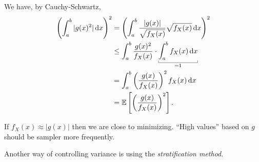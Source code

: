 \documentclass[12pt]{report}
\begin{document}
\begin{fancyproof}
	We have, by Cauchy-Schwartz,
	\begin{align*}
		\left(\int_{a}^{b}|g(x)^{2}|\dx\right)^{2}&=\left(\int_{a}^{b}\frac{|g(x)|}{\sqrt{f_X(x)}}\sqrt{f_X(x)}\dx\right)^{2}\\
		&\leq\int_{a}^{b}\frac{g(x)^{2}}{f_X(x)}\cdot\ubracketthin{\int_{a}^{b}f_X(x)\dx}_{=1}\\
		&=\int_{a}^{b}\left(\frac{g(x)}{f_X(x)}\right)^{2}f_X(x)\dx\\
		&=\ev{\left(\frac{g(x)}{f_X(x)}\right)^{2}}.
	\end{align*}
\end{fancyproof}
If $f_X(x)\approx|g(x)|$ then we are close to minimizing. ``High values'' based on $g$ should be sampler more frequently.\par
Another way of controlling variance is using the \emph{stratification method}.
\end{document}
